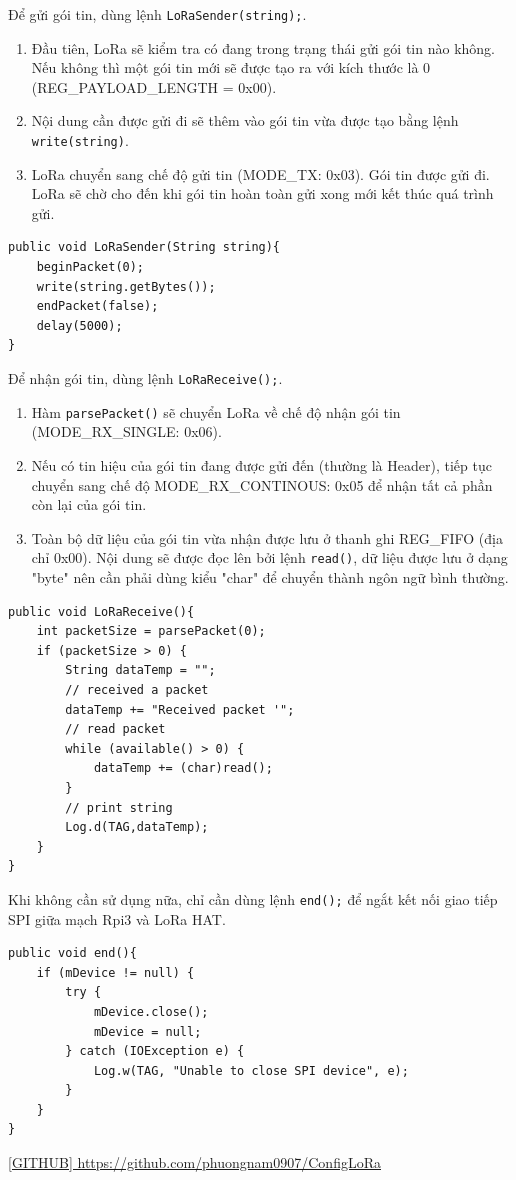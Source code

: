 Để gửi gói tin, dùng lệnh \lstinline{LoRaSender(string);}.
\begin{enumerate}
\item Đầu tiên, LoRa sẽ kiểm tra có đang trong trạng thái gửi gói tin nào không. Nếu không thì một gói tin mới sẽ được tạo ra với kích thước là 0 (REG\_PAYLOAD\_LENGTH = 0x00).
\item Nội dung cần được gửi đi sẽ thêm vào gói tin vừa được tạo bằng lệnh \lstinline{write(string)}.
\item LoRa chuyển sang chế độ gửi tin (MODE\_TX: 0x03). Gói tin được gửi đi. LoRa sẽ chờ cho đến khi gói tin hoàn toàn gửi xong mới kết thúc quá trình gửi.
\end{enumerate}
\begin{lstlisting}[label={list:third},caption=Hàm gửi gói tin]
public void LoRaSender(String string){
    beginPacket(0);
    write(string.getBytes());
    endPacket(false);
    delay(5000);
}
\end{lstlisting}

Để nhận gói tin, dùng lệnh \lstinline{LoRaReceive();}.
\begin{enumerate}
\item Hàm \lstinline{parsePacket()} sẽ chuyển LoRa về chế độ nhận gói tin \newline(MODE\_RX\_SINGLE: 0x06).
\item Nếu có tin hiệu của gói tin đang được gửi đến (thường là Header), tiếp tục chuyển sang chế độ MODE\_RX\_CONTINOUS: 0x05 để nhận tất cả phần còn lại của gói tin.
\item Toàn bộ dữ liệu của gói tin vừa nhận được lưu ở thanh ghi REG\_FIFO (địa chỉ 0x00). Nội dung sẽ được đọc lên bởi lệnh \lstinline{read()}, dữ liệu được lưu ở dạng "byte" nên cần phải dùng kiểu "char" để chuyển thành ngôn ngữ bình thường.
\end{enumerate}
\begin{lstlisting}[label={list:fourth},caption=Hàm nhận gói tin]
public void LoRaReceive(){
    int packetSize = parsePacket(0);
    if (packetSize > 0) {
        String dataTemp = "";
        // received a packet
        dataTemp += "Received packet '";
        // read packet
        while (available() > 0) {
            dataTemp += (char)read();
        }
        // print string
        Log.d(TAG,dataTemp);
    }
}
\end{lstlisting}

Khi không cần sử dụng nữa, chỉ cần dùng lệnh \lstinline{end();} để ngắt kết nối giao tiếp SPI giữa mạch Rpi3 và LoRa HAT.
\begin{lstlisting}[label={list:fifth},caption=Kết thúc việc điều khiển board LoRa]
public void end(){
    if (mDevice != null) {
        try {
            mDevice.close();
            mDevice = null;
        } catch (IOException e) {
            Log.w(TAG, "Unable to close SPI device", e);
        }
    }
}
\end{lstlisting}

\href{https://github.com/phuongnam0907/ConfigLoRa}{[GITHUB] https://github.com/phuongnam0907/ConfigLoRa} 
%
%
%
%
%
%